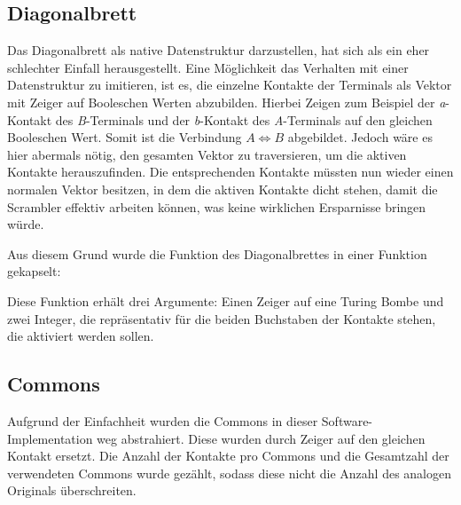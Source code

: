 \subsection{Diagonalbrett}\label{subsec:impl_diagonal_board}
Das Diagonalbrett als native Datenstruktur darzustellen, hat sich als ein eher schlechter Einfall herausgestellt.
Eine Möglichkeit das Verhalten mit einer Datenstruktur zu imitieren, ist es, die einzelne Kontakte der Terminals als Vektor mit Zeiger auf Booleschen Werten abzubilden.
Hierbei Zeigen zum Beispiel der \emph{a}-Kontakt des \emph{B}-Terminals und der \emph{b}-Kontakt des \emph{A}-Terminals auf den gleichen Booleschen Wert.
Somit ist die Verbindung $A \Leftrightarrow B$ abgebildet.
Jedoch wäre es hier abermals nötig, den gesamten Vektor zu traversieren, um die aktiven Kontakte herauszufinden.
Die entsprechenden Kontakte müssten nun wieder einen normalen Vektor besitzen, in dem die aktiven Kontakte \glqq dicht\grqq{} stehen, damit die Scrambler effektiv arbeiten können, was keine wirklichen Ersparnisse bringen würde.

Aus diesem Grund wurde die Funktion des Diagonalbrettes in einer Funktion gekapselt:

\noindent


Diese Funktion erhält drei Argumente: Einen Zeiger auf eine Turing Bombe und zwei Integer, die repräsentativ für die beiden Buchstaben der Kontakte stehen, die aktiviert werden sollen.


\subsection{Commons}\label{subsec:impl_commons}
Aufgrund der Einfachheit wurden die Commons in dieser Software-Implementation \glqq weg abstrahiert\grqq.
Diese wurden durch Zeiger auf den gleichen Kontakt ersetzt.
Die Anzahl der Kontakte pro Commons und die Gesamtzahl der verwendeten Commons wurde gezählt, sodass diese nicht die Anzahl des analogen Originals überschreiten.

